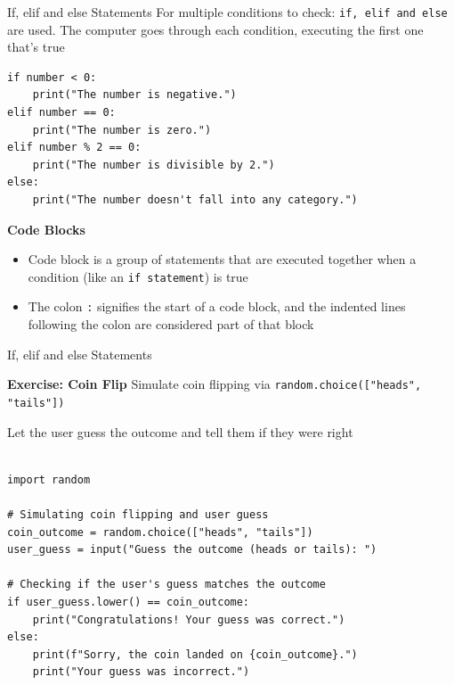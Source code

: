 \documentclass[
	11pt, 
]{beamer}
\begin{document}

\begin{frame}[fragile]{If, elif and else Statements}
For multiple conditions to check: \texttt{if, elif and else} are used. The computer goes through each condition, executing the first one that's true

\begin{verbatim}
if number < 0:
    print("The number is negative.")
elif number == 0:
    print("The number is zero.")
elif number % 2 == 0:
    print("The number is divisible by 2.")
else:
    print("The number doesn't fall into any category.")
\end{verbatim}

\begin{block}{\textbf{Code Blocks}}
\begin{itemize}
    \item Code block is a group of statements that are executed together when a condition (like an \texttt{if statement}) is true
    \item The colon \texttt{:} signifies the start of a code block, and the indented lines following the colon are considered part of that block
\end{itemize}
\end{block}

\end{frame}


\begin{frame}[fragile]{If, elif and else Statements}

\begin{alertblock}{\textbf{Exercise: Coin Flip}}
Simulate coin flipping via \texttt{random.choice(["heads", "tails"])}

Let the user guess the outcome and tell them if they were right
\end{alertblock}

\pause

\begin{verbatim}

import random

# Simulating coin flipping and user guess
coin_outcome = random.choice(["heads", "tails"])
user_guess = input("Guess the outcome (heads or tails): ")

# Checking if the user's guess matches the outcome
if user_guess.lower() == coin_outcome:
    print("Congratulations! Your guess was correct.")
else:
    print(f"Sorry, the coin landed on {coin_outcome}.")
    print("Your guess was incorrect.")


\end{verbatim}
\end{frame}
\end{document}
